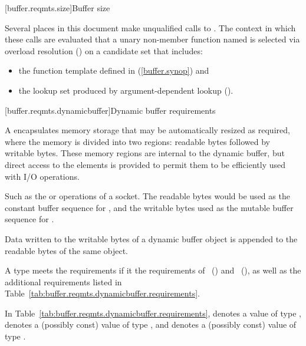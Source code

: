 [buffer.reqmts.size]{Buffer size}

\pnum
Several places in this document make unqualified calls to .
The context in which these calls are evaluated  that
a unary non-member function named 
is selected via overload resolution ()
on a candidate set that includes:

\begin{itemize}
\item the  function template defined in  (\ref{buffer.synop}) and
\item the lookup set produced by argument-dependent lookup ().
\end{itemize}


[buffer.reqmts.dynamicbuffer]{Dynamic buffer requirements}

\pnum
A  encapsulates memory storage that may be automatically resized as required, where the memory is divided into two regions: readable bytes followed by writable bytes. These memory regions are internal to the dynamic buffer, but direct access to the elements is provided to permit them to be efficiently used with I/O operations. \begin{note} Such as the  or  operations of a socket. The readable bytes would be used as the constant buffer sequence for , and the writable bytes used as the mutable buffer sequence for . \end{note} Data written to the writable bytes of a dynamic buffer object is appended to the readable bytes of the same object.

\pnum
A type  meets the  requirements if it  the requirements of ~() and ~(), as well as the additional requirements listed in Table~\ref{tab:buffer.reqmts.dynamicbuffer.requirements}.

\pnum
In Table~\ref{tab:buffer.reqmts.dynamicbuffer.requirements},
 denotes a value of type ,
 denotes a (possibly const) value of type ,
and  denotes a (possibly const) value of type .

